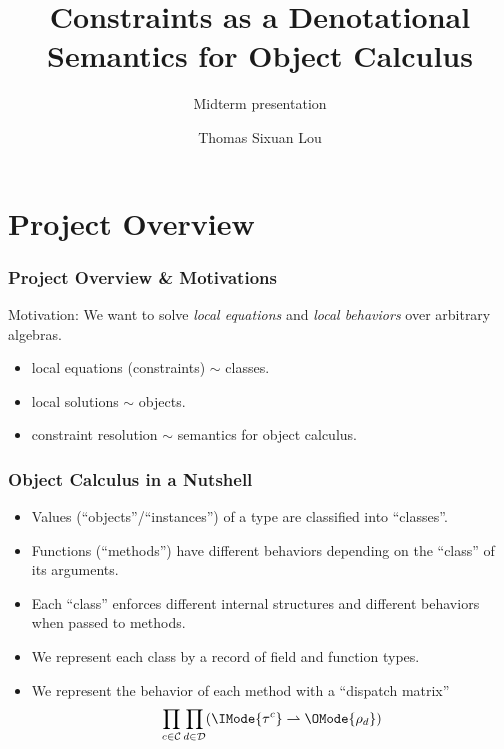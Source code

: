 \documentclass[xcolor=dvipsnames]{beamer}
\begin{document}
\title{Constraints as a Denotational Semantics for Object Calculus}
\subtitle{Midterm presentation}
\author{Thomas Sixuan Lou}

\frame{\titlepage}

\section{Project Overview}

\begin{frame}
  \frametitle{Project Overview \& Motivations}
  Motivation: We want to solve \emph{local equations} and \emph{local behaviors}
  over arbitrary algebras.

  \bigskip

  \pause

  \begin{itemize}
    \item local equations (constraints) $\sim$ classes.
      \pause
    \item local solutions $\sim$ objects.
      \pause
    \item constraint resolution $\sim$ semantics for object calculus.
  \end{itemize}

\end{frame}

\begin{frame}
  \frametitle{Object Calculus in a Nutshell}

  \begin{itemize}
    \item Values (``objects''/``instances'') of a type are classified into ``classes''.
      \pause
    \item Functions (``methods'') have different behaviors depending on the ``class'' of its arguments.
      \pause
    \item Each ``class'' enforces different internal structures and different behaviors when passed to methods.
      \pause
    \item We represent each class by a record of field and function types.
      \pause
    \item We represent the behavior of each method with a ``dispatch matrix''
      \[ \prod_{c \in \mathcal{C}} \prod_{d \in \mathcal{D}} ( \IMode{\tau^c} \rightharpoonup \OMode{\rho_d}) \]
  \end{itemize}

\end{frame}
\end{document}
